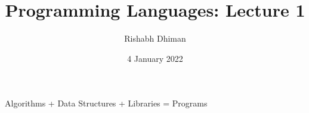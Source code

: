 \documentclass[a4paper]{scrartcl}
\title{Programming Languages: Lecture 1}
\author{Rishabh Dhiman}
\date{4 January 2022}
\begin{document}
\maketitle

\begin{displayquote}
	Algorithms + Data Structures + Libraries = Programs
\end{displayquote}
\end{document}
